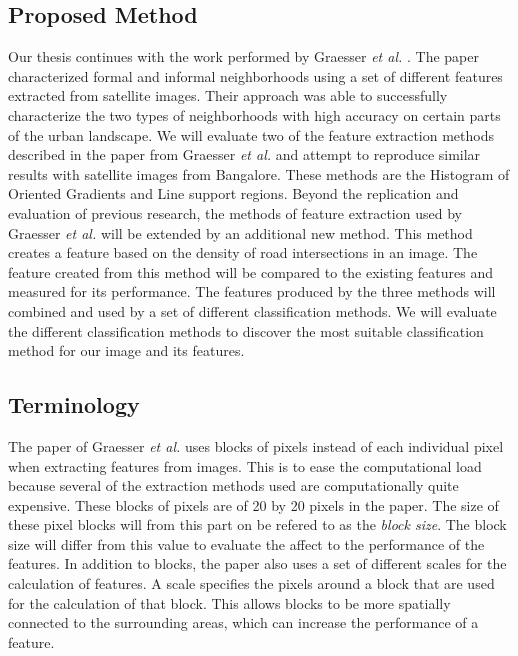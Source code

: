 

 
\subsection{Proposed Method}

Our thesis continues with the work performed by Graesser \textit{et al.} \cite{graesser2012image}.
The paper characterized formal and informal neighborhoods using a set of different
features extracted from satellite images. Their approach was able to successfully characterize the
two types of neighborhoods with high accuracy on certain parts of the urban landscape. We will evaluate two of the feature extraction methods described in the paper from Graesser \textit{et al.} and attempt to reproduce similar results with satellite images from Bangalore. These methods are the Histogram of Oriented Gradients and Line support regions. Beyond the replication and evaluation of previous research, the methods of feature extraction used by Graesser \textit{et al.} will be extended by an additional new method.
This method creates a feature based on the density of road intersections in an image. The feature created from this method will be compared to the existing features and measured for its performance. The features produced by the three methods will combined and used by a set of different classification methods.
We will evaluate the different classification methods to discover the most suitable classification method for our image and its features. 

\subsection{Terminology}
The paper of Graesser \textit{et al.} \cite{graesser2012image} uses blocks of pixels instead of each
individual pixel when extracting features from images.  This is to ease the
computational load because several of the extraction methods used are
computationally quite expensive. These blocks of pixels are of 20 by
20 pixels in the paper. The size of these pixel blocks will from this part on
be refered to as the \textit{block size}. The block size will differ from
this value to evaluate the affect to the performance of the features.
In addition to blocks, the paper also uses a set of different scales for the
calculation of features. A scale specifies the pixels around a block that
are used for the calculation of that block. This allows blocks to be more
spatially connected to the surrounding areas, which can increase the
performance of a feature.


